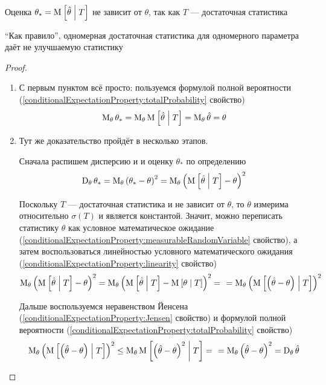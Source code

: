 \begin{remark}
  Оценка $\theta_* = \operatorname{M}_{} \left[ \hat{\theta} \;\middle|\; T \right]$ не зависит от $\theta$,
  так как $T$ --- достаточная статистика
\end{remark}

\begin{remark}
  ``Как правило'', одномерная достаточная статистика
  для одномерного параметра даёт не улучшаемую статистику
\end{remark}

\begin{proof}
  \begin{enumerate}
      \item С первым пунктом всё просто:
      пользуемся формулой полной вероятности
      (\ref{conditionalExpectationProperty:totalProbability} свойство)
      $$\operatorname{M}_{\theta} \theta_*
      = \operatorname{M}_{\theta} \operatorname{M}_{} \left[ \hat{\theta} \;\middle|\; T \right]
      = \operatorname{M}_{\theta} \hat{\theta}
      = \theta$$
      \item Тут же доказательство пройдёт в несколько этапов.

      Сначала распишем дисперсию и и оценку $\theta_*$ по определению
      $$\operatorname{D}_{\theta} \theta_*
      = \operatorname{M}_{\theta} \left( \theta_* - \theta \right)^2
      = \operatorname{M}_{\theta} \left( \operatorname{M}_{} \left[ \hat{\theta} \;\middle|\; T \right]
    - \theta \right)^2$$

      Поскольку $T$ --- достаточная статистика и не зависит от $\theta$,
      то $\theta$ измерима относительно $\sigma\left( T \right)$
      и является константой. Значит, можно переписать
      статистику $\theta$ как условное математическое ожидание
      (\ref{conditionalExpectationProperty:measurableRandomVariable}
      свойство), а затем воспользоваться линейностью
      условного математического ожидания
      (\ref{conditionalExpectationProperty:linearity} свойство)
      \begin{align*}
      \operatorname{M}_{\theta} \left( \operatorname{M}_{} \left[ \hat{\theta} \;\middle|\; T \right]
        - \theta \right)^2
    = \operatorname{M}_{\theta} \left( \operatorname{M}_{} \left[ \hat{\theta} \;\middle|\; T \right]
        - \operatorname{M}_{} \left[ \theta \;\middle|\; T \right] \right)^2 = \ \
    = \operatorname{M}_{\theta} \left(
        \operatorname{M}_{} \left[ \left( \hat{\theta} - \theta \right) \;\middle|\; T \right]
        \right)^2
      \end{align*}

      Дальше воспользуемся неравенством Йенсена
      (\ref{conditionalExpectationProperty:Jensen} свойство)
      и формулой полной вероятности
      (\ref{conditionalExpectationProperty:totalProbability} свойство)
      \begin{align*}
      \operatorname{M}_{\theta} \left( \operatorname{M}_{} \left[ \left( \hat{\theta}
        - \theta \right) \;\middle|\; T \right]\right)^2
    \le \operatorname{M}_{\theta} \operatorname{M}_{} \left[ \left( \hat{\theta}
        - \theta \right)^2 \;\middle|\; T \right] = \ \
    = \operatorname{M}_{\theta} \left( \hat{\theta} -\theta \right)^2
    = \operatorname{D}_{\theta} \hat{\theta}
      \end{align*}
  \end{enumerate}
\end{proof}

